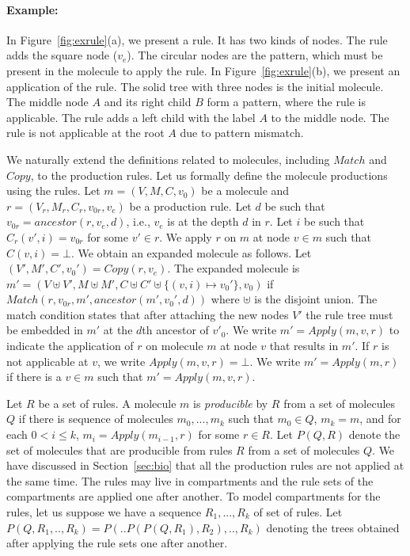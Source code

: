 \paragraph{Example:} In Figure~\ref{fig:exrule}(a), we present a rule. It has
  two kinds of nodes.
  The rule adds the square node ($v_e$).
  The circular nodes %
  are the pattern, which must be present in the molecule to apply the rule.
  In Figure~\ref{fig:exrule}(b), we present an application of the rule.
  The solid tree with three nodes is the initial molecule.
  The middle node $A$ and its right child $B$ form a pattern, where the rule is applicable.
  The rule adds a left child with the label $A$ to the middle node.
  The rule is not applicable at the root $A$ due to pattern mismatch.


We naturally extend the definitions related to molecules, including $Match$ and $Copy$,
to the production rules.
Let us formally define the molecule productions using the rules.
Let $m = (V,M,C,v_0)$ be a molecule and $r = (V_r, M_r, C_r, v_{0r}, v_e)$ be a production rule.
Let $d$ be such that $v_{0r} = ancestor(r,v_e,d)$, i.e., $v_e$ is at the depth $d$ in $r$.
Let $i$ be such that $C_r(v',i) = v_{0r}$ for some $v' \in r$.
We apply $r$ on $m$ at node $v \in m$ such that $C(v,i) = \bot$.
We obtain an expanded molecule as follows.
Let $(V',M',C',v_0') = Copy(r,v_e)$.
The expanded molecule is
$
m' = (V \uplus V', M \uplus M', C \uplus C' \uplus \{(v,i) \mapsto v_0'\}, v_0)
$ if
$Match( r, v_{0r}, m', ancestor(m', v_0', d) )$ where $\uplus$ is the disjoint union.
The match condition states that after attaching the new nodes $V'$
the rule tree must be embedded in $m'$ at the $d$th ancestor of $v'_0$. 
We write $m' = Apply(m, v, r)$ to indicate the application of $r$
on molecule $m$ at node $v$ that results in $m'$.
If $r$ is not applicable at $v$, we write $Apply(m, v, r) = \bot$.
We write $m' = Apply(m, r)$ if there is a $v \in m$ such that
$m' = Apply(m,v,r)$.

Let $R$ be a set of rules.
A molecule $m$ is {\em producible} by $R$ from a set of molecules $Q$
if there is sequence of molecules $m_0,...,m_k$
such that $m_0 \in Q$, $m_k=m$, and
for each $0<i\leq k$, $m_{i} = Apply(m_{i-1},r)$ for some $r \in R$.
Let $P(Q,R)$ denote the set of molecules that are producible from
rules $R$ from a set of molecules $Q$.
We have discussed in Section~\ref{sec:bio} that all the production rules
are not applied at the same time.
The rules may live in compartments and
the rule sets of the compartments are applied one after another.
To model compartments for the rules,
let us suppose we have a sequence $R_1,...,R_k$ of set of rules.
Let $P(Q, R_1,..,R_k) = P(..P(P(Q,R_1),R_2),..,R_k)$ denoting the
trees obtained after applying the rule sets one after another.


